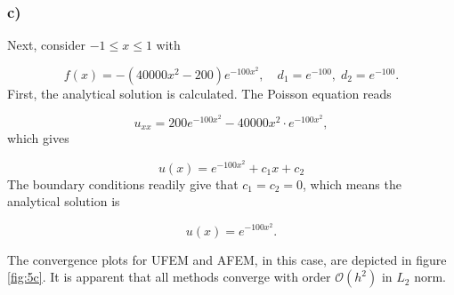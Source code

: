 \subsubsection{c)}
Next, consider $-1 \le x \le 1$ with 

\begin{equation}
    f(x) = -(40000x^2-200)e^{-100x^2}, \quad d_1 = e^{-100}, \; d_2 = e^{-100}.
\label{5c}
\end{equation}
First, the analytical solution is calculated. The Poisson equation reads

\begin{equation}
    u_{xx} =  200e^{-100x^2} - 40000x^2 \cdot e^{-100x^2},
\end{equation}
which gives

\begin{equation}
    u(x) = e^{-100x^2} + c_1x + c_2
\end{equation}
The boundary conditions readily give that $c_1 = c_2 = 0$, which means the analytical solution is

\begin{equation}
u(x) = e^{-100x^2}.
\end{equation}

\noindent The convergence plots for UFEM and AFEM, in this case, are depicted in figure \ref{fig:5c}. It is apparent that all methods converge with order $\mathcal{O}(h^2)$ in $L_2$ norm.

